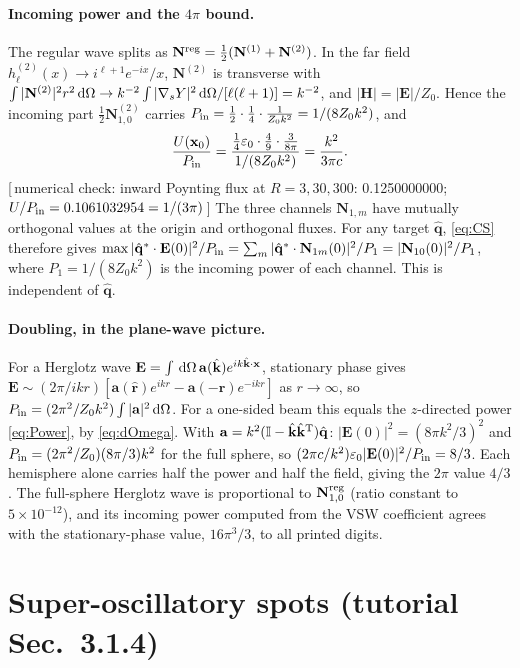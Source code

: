 \documentclass[11pt,letterpaper]{article}
\newcommand{\vect}[1]{\mathbf{#1}}
\newcommand{\Ev}{\vect{E}}
\newcommand{\Hv}{\vect{H}}
\newcommand{\Nv}{\vect{N}}
\newcommand{\xv}{\vect{x}}
\newcommand{\kv}{\vect{k}}
\newcommand{\khat}{\hat{\kv}}
\newcommand{\rhat}{\hat{\vect{r}}}
\newcommand{\qhat}{\hat{\vect{q}}}
\newcommand{\dO}{\,{\rm d}\Omega}
\newcommand{\II}{\mathbb{I}}
\newcommand{\numcheck}[1]{\hfill{\small\color{green!40!black}[\,numerical check: #1\,]}}
\begin{document}
\paragraph{Incoming power and the $4\pi$ bound.} The regular wave splits as $\Nv^{\rm reg}=\tfrac12(\Nv^{(1)}+\Nv^{(2)})$. In the far field $h^{(2)}_\ell(x)\to i^{\ell+1}e^{-ix}/x$, $\Nv^{(2)}$ is transverse with $\int|\Nv^{(2)}|^2r^2\dO\to k^{-2}\int|\nabla_sY|^2\dO/[\ell(\ell+1)]=k^{-2}$, and $|\Hv|=|\Ev|/Z_0$. Hence the incoming part $\tfrac12\Nv^{(2)}_{1,0}$ carries $P_{\rm in}=\tfrac12\cdot\tfrac14\cdot\tfrac1{Z_0k^2}=1/(8Z_0k^2)$, and
\begin{align}
    \frac{U(\xv_0)}{P_{\rm in}}=\frac{\tfrac14\varepsilon_0\cdot\tfrac49\cdot\tfrac{3}{8\pi}}{1/(8Z_0k^2)}=\frac{k^2}{3\pi c}.
\end{align}
\numcheck{inward Poynting flux at $R=3,30,300$: 0.1250000000; $U/P_{\rm in}=0.1061032954=1/(3\pi)$}
The three channels $\Nv_{1,m}$ have mutually orthogonal values at the origin and orthogonal fluxes. For any target $\qhat$, \eqref{eq:CS} therefore gives $\max|\qhat^*\cdot\Ev(0)|^2/P_{\rm in}=\sum_m|\qhat^*\cdot\Nv_{1m}(0)|^2/P_1=|\Nv_{10}(0)|^2/P_1$, where $P_1=1/(8Z_0k^2)$ is the incoming power of each channel. This is independent of $\qhat$.

\paragraph{Doubling, in the plane-wave picture.} For a Herglotz wave $\Ev=\int\dO\,\vect a(\khat)e^{ik\khat\cdot\xv}$, stationary phase gives $\Ev\sim(2\pi/ikr)[\vect a(\rhat)e^{ikr}-\vect a(-\rhat)e^{-ikr}]$ as $r\to\infty$, so $P_{\rm in}=(2\pi^2/Z_0k^2)\int|\vect a|^2\dO$. For a one-sided beam this equals the $z$-directed power \eqref{eq:Power}, by \eqref{eq:dOmega}. With $\vect a=k^2(\II-\khat\khat^{\rm T})\qhat$: $|\Ev(0)|^2=(8\pi k^2/3)^2$ and $P_{\rm in}=(2\pi^2/Z_0)(8\pi/3)k^2$ for the full sphere, so $(2\pi c/k^2)\varepsilon_0|\Ev(0)|^2/P_{\rm in}=8/3$. Each hemisphere alone carries half the power and half the field, giving the $2\pi$ value $4/3$. The full-sphere Herglotz wave is proportional to $\Nv_{1,0}^{\rm reg}$ (ratio constant to $5\times10^{-12}$), and its incoming power computed from the VSW coefficient agrees with the stationary-phase value, $16\pi^3/3$, to all printed digits.

\section{Super-oscillatory spots (tutorial Sec.~3.1.4)}
\end{document}
